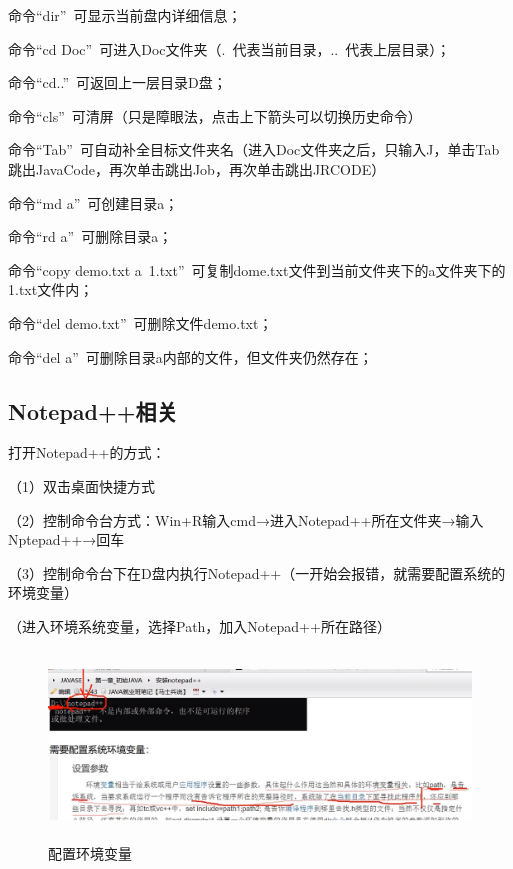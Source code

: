 \documentclass{article}
\begin{document}
	命令“dir”\ 可显示当前盘内详细信息；
	
	命令“cd Doc”\ 可进入Doc文件夹（.\ 代表当前目录，..\ 代表上层目录）；
	
	命令“cd..”\ 可返回上一层目录D盘；
	
	命令“cls”\ 可清屏（只是障眼法，点击上下箭头可以切换历史命令）
	
	命令“Tab”\ 可自动补全目标文件夹名（进入Doc文件夹之后，只输入J，单击Tab跳出JavaCode，再次单击跳出Job，再次单击跳出JRCODE）
	
	命令“md a”\ 可创建目录a；

	命令“rd a”\ 可删除目录a；
	
	命令“copy demo.txt a\ 1.txt”\ 可复制dome.txt文件到当前文件夹下的a文件夹下的1.txt文件内；
	
	命令“del demo.txt”\ 可删除文件demo.txt；
	
	命令“del a”\ 可删除目录a内部的文件，但文件夹仍然存在；
	
	\subsection{Notepad++相关}
	
	打开Notepad++的方式：
	
		\setlength{\parindent}{4em}
	（1）双击桌面快捷方式
	
	（2）控制命令台方式：Win+R输入cmd→进入Notepad++所在文件夹→输入Nptepad++→回车
	
	（3）控制命令台下在D盘内执行Notepad++（一开始会报错，就需要配置系统的环境变量）
	
	（进入环境系统变量，选择Path，加入Notepad++所在路径）
	
	\begin{figure}[ht]
		\centering
		\includegraphics[height=50mm]{5.png}
		\caption{配置环境变量}
		\label{fig:label}
	\end{figure}
	
	\ 
	
	\ 
	
	\ 
	
\end{document}
